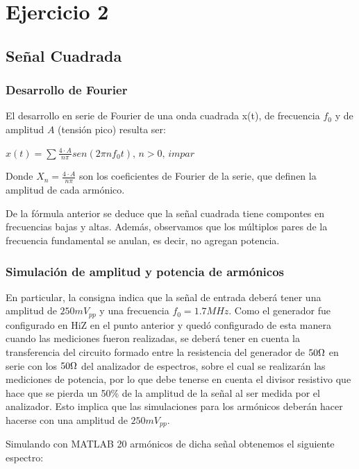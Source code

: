 \documentclass[../../labo_tp5_main.tex]{subfiles}
\begin{document}
\section{Ejercicio 2}

\subsection{Señal Cuadrada}

\subsubsection{Desarrollo de Fourier}
El desarrollo en serie de Fourier de una onda cuadrada x(t), de frecuencia $f_0$ y de amplitud $A$ (tensión pico) resulta ser: \par
\begin{center}
$x(t) = \sum\frac{4\cdot A}{n\pi}sen(2\pi nf_{0}t),\,n>0,\,impar$
\end{center}
Donde $X_n = \frac{4\cdot A}{n\pi}$ son los coeficientes de Fourier de la serie, que definen la amplitud de cada armónico.\par
De la fórmula anterior se deduce que la señal cuadrada tiene compontes en frecuencias bajas y altas. Además, observamos que los múltiplos pares de la frecuencia fundamental se anulan, es decir, no agregan potencia.\par

\subsubsection{Simulación de amplitud y potencia de armónicos}

En particular, la consigna indica que la señal de entrada deberá tener una amplitud de $250mV_{pp}$ y una frecuencia $f_0 = 1.7MHz$. Como el generador fue configurado en HiZ en el punto anterior y quedó configurado de esta manera cuando las mediciones fueron realizadas, se deberá tener en cuenta la transferencia del circuito formado entre la resistencia del generador de $50\ohm$  en serie con los $50\ohm$ del analizador de espectros, sobre el cual se realizarán las mediciones de potencia, por lo que debe tenerse en cuenta el divisor resistivo que hace que se pierda un 50\% de la amplitud de la señal al ser medida por el analizador. Esto implica que las simulaciones para los armónicos deberán hacer hacerse con una amplitud de $250mV_{pp}$.\par
Simulando con MATLAB 20 armónicos de dicha señal obtenemos el siguiente espectro: \par
\end{document}
